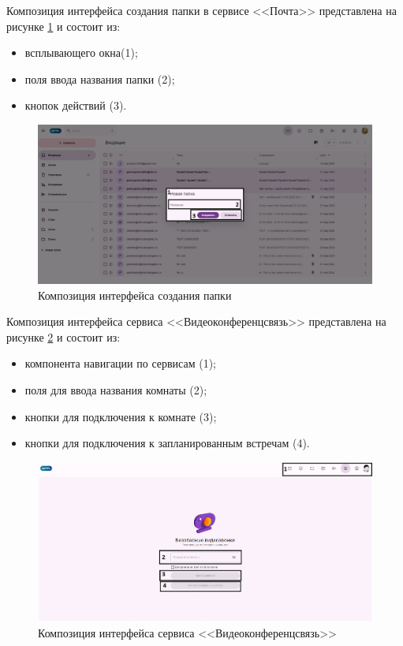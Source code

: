 Композиция интерфейса создания папки в сервисе <<Почта>> представлена на рисунке \ref{templ:image1d} и состоит из:
\begin{itemize}
  \item всплывающего окна(1);
  \item поля ввода названия папки (2);
  \item кнопок действий (3).
\end{itemize}
\begin{figure}[H]
	\centering
	\includegraphics[width=1\linewidth]{images/почта4}
	\caption{Композиция интерфейса создания папки}
	\label{templ:image1d}
\end{figure}

Композиция интерфейса сервиса <<Видеоконференцсвязь>> представлена на рисунке \ref{templ:image2} и состоит из:
\begin{itemize}
  \item компонента навигации по сервисам (1);
  \item поля для ввода названия комнаты (2);
  \item кнопки для подключения к комнате (3);
  \item кнопки для подключения к запланированным встречам (4).
\end{itemize}
\begin{figure}[H]
	\centering
	\includegraphics[width=1\linewidth]{images/вкс}
	\caption{Композиция интерфейса сервиса <<Видеоконференцсвязь>>}
	\label{templ:image2}
\end{figure}

